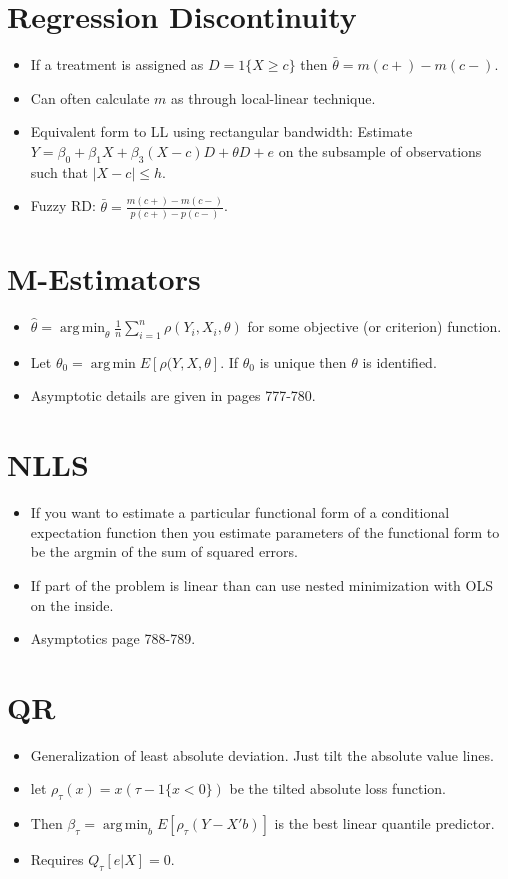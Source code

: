 \documentclass[11pt]{article} %
\DeclareMathOperator*{\argmin}{arg\,min}
\begin{document}
\section{Regression Discontinuity}
\begin{itemize}
\item If a treatment is assigned as $D = 1\{ X\geq c\}$ then $\bar{\theta} = m(c+) - m(c-).$
\item Can often calculate $m$ as through local-linear technique.
\item Equivalent form to LL using rectangular bandwidth: Estimate $Y = \beta_0 + \beta_1X + \beta_3(X-c)D + \theta D + e$ on the subsample of observations such that $|X-c|\leq h$.
\item Fuzzy RD: $\bar{\theta} = \frac{m(c+) - m(c-)}{p(c+) - p(c-)}$.
\end{itemize}

\section{M-Estimators}
\begin{itemize}
\item $\hat{\theta} = \argmin_{\theta} \frac{1}{n}\sum_{i=1}^n \rho(Y_i,X_i,\theta)$ for some objective (or criterion) function. 
\item Let $\theta_0 = \argmin E[\rho(Y,X,\theta]$. If $\theta_0$ is unique then $\theta$ is identified.
\item Asymptotic details are given in pages 777-780.
\end{itemize}

\section{NLLS}
\begin{itemize}
\item If you want to estimate a particular functional form of a conditional expectation function then you estimate parameters of the functional form to be the argmin of the sum of squared errors.
\item If part of the problem is linear than can use nested minimization with OLS on the inside.
\item Asymptotics page 788-789.
\end{itemize}

\section{QR}
\begin{itemize}
\item Generalization of least absolute deviation. Just tilt the absolute value lines.
\item let $\rho_{\tau}(x) = x(\tau - 1\{ x<0\})$ be the tilted absolute loss function.
\item Then $\beta_{\tau} = \argmin_b E[\rho_{\tau}(Y-X'b)]$ is the best linear quantile predictor.
\item Requires $Q_{\tau}[e|X] = 0.$
\end{itemize}
\end{document}
